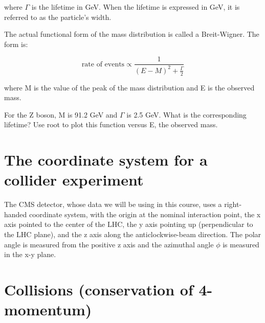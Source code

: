 \noindent where  $\Gamma$ is the lifetime in GeV.  When the lifetime is expressed in GeV,  it is referred to as the particle's width.

\noindent The actual functional form of the mass distribution is called a Breit-Wigner.  The form is:


	  \begin{equation} \text{rate  of  events} \propto \frac{1}{(E-M)^2 + \frac{\Gamma}{2}} \end{equation} 

\noindent where M is the value of the peak of the mass distribution and E is the observed mass.

\vspace{.2cm} 
\begin{minipage}{0.9\textwidth} 
\begin{framed}
\begin{exercise}
{For the Z boson, M is 91.2 GeV and $\Gamma$  is 2.5 GeV.  What is the corresponding lifetime?  Use root to plot this function versus E, the observed mass.}
\end{exercise}
\end{framed} 
\end{minipage}
\vspace{.2cm}



\section{The coordinate system for a collider experiment}

The CMS detector, whose data we will be using in this course, uses a right-handed coordinate system, with the origin at the nominal interaction point, the x axis pointed to the center of the LHC, the y axis pointing up (perpendicular to the LHC plane), and the z axis along the anticlockwise-beam direction.  The polar angle   is measured from the positive z axis and the azimuthal angle  $\phi$  is measured in the x-y plane.

\section{Collisions (conservation of 4-momentum)}

